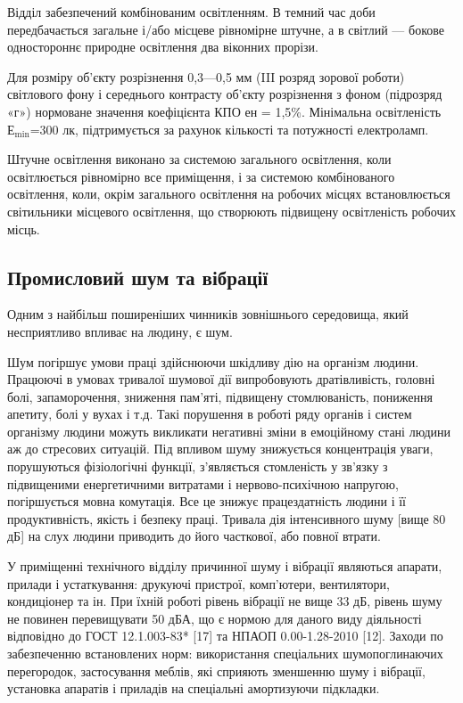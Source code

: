 %
%

Відділ забезпечений комбінованим освітленням. В темний час доби передбачається загальне і/або місцеве рівномірне штучне, а в світлий --- бокове одностороннє природне освітлення два віконних прорізи.

Для розміру об'єкту розрізнення 0,3---0,5 мм (III розряд зорової роботи) світлового фону і середнього контрасту об'єкту розрізнення з фоном (підрозряд «г») нормоване значення коефіцієнта КПО ен = 1,5\%. Мінімальна освітленість $\text{Е}_\text{min}$=300 лк, підтримується за рахунок кількості та потужності електроламп.

Штучне освітлення виконано за системою загального освітлення, коли освітлюється рівномірно все приміщення, і за системою комбінованого освітлення, коли, окрім загального освітлення на робочих місцях встановлюється світильники місцевого освітлення, що створюють підвищену освітленість робочих місць.

\subsection{Промисловий шум та вібрації}
Одним з найбільш поширеніших чинників зовнішнього середовища, який несприятливо впливає на людину, є шум.

Шум погіршує умови праці здійснюючи шкідливу дію на організм людини. Працюючі в умовах тривалої шумової дії випробовують дратівливість, головні болі, запаморочення, зниження пам'яті, підвищену стомлюваність, пониження апетиту, болі у вухах і т.д. Такі порушення в роботі ряду органів і систем організму людини можуть викликати негативні зміни в емоційному стані людини аж до стресових ситуацій. Під впливом шуму знижується концентрація уваги, порушуються фізіологічні функції, з'являється стомленість у зв'язку з підвищеними енергетичними витратами і нервово-психічною напругою, погіршується мовна комутація. Все це знижує працездатність людини і її продуктивність, якість і безпеку праці. Тривала дія інтенсивного шуму [вище 80 дБ] на слух людини приводить до його часткової, або повної втрати. 

У приміщенні технічного відділу причинної шуму і вібрації являються апарати, прилади і устаткування: друкуючі пристрої, комп'ютери, вентилятори, кондиціонер та ін. При їхній роботі рівень вібрації не вище 33 дБ, рівень шуму не повинен перевищувати 50 дБА, що є нормою для даного виду діяльності відповідно до ГОСТ 12.1.003-83* [17] та НПАОП 0.00-1.28-2010 [12]. Заходи по забезпеченню встановлених норм: використання спеціальних шумопоглинаючих перегородок, застосування меблів, які сприяють зменшенню шуму і вібрації, установка апаратів і приладів на спеціальні амортизуючи підкладки.

